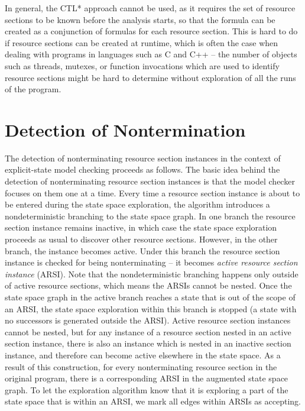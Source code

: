 In general, the CTL* approach cannot be used, as it requires the set of resource sections to be known before the analysis starts, so that the formula can be created as a conjunction of formulas for each resource section.
This is hard to do if resource sections can be created at runtime, which is often the case when dealing with programs in languages such as C and C++ -- the number of objects such as threads, mutexes, or function invocations which are used to identify resource sections might be hard to determine without exploration of all the runs of the program.

\section{Detection of Nontermination}\label{sec:detection}

The detection of nonterminating resource section instances in the context of
explicit-state model checking proceeds as follows. The basic idea behind the
detection of nonterminating resource section instances is that the model checker
focuses on them one at a time. Every time a resource section instance is about
to be entered during the state space exploration, the algorithm introduces a
nondeterministic branching to the state space graph. In one branch the resource
section instance remains inactive, in which case the state space exploration
proceeds as usual to discover other resource sections. However, in the other
branch, the instance becomes active. Under this branch the resource section
instance is checked for being nonterminating -- it becomes \emph{active resource section instance} (ARSI).
Note that the nondeterministic
branching happens only outside of active resource sections, which means the
ARSIs cannot be nested.  Once the
state space graph in the active branch reaches a state that is out of the scope of an ARSI, the state
space exploration within this branch is stopped (a state with no successors is
generated outside the ARSI). Active resource section instances cannot be
nested, but for any instance of a resource section nested in an active section
instance, there is also an instance which is nested in an inactive section
instance, and therefore can become active elsewhere in the state space. As a
result of this construction, for every nonterminating resource section in the
original program, there is a corresponding ARSI in the augmented state space
graph. To let the exploration algorithm know that it is exploring a part of the
state space that is within an ARSI, we mark all edges within ARSIs as accepting.

